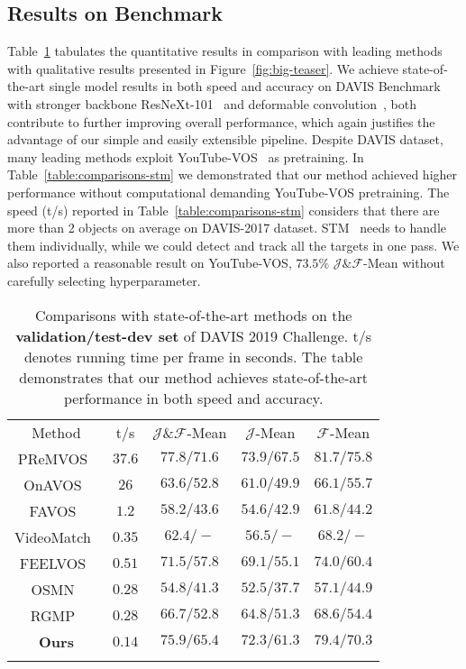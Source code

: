 \documentclass[10pt,twocolumn,letterpaper]{article}
\begin{document}
\subsection{Results on Benchmark}
\vspace{-0.5em}
Table~\ref{table:comparisons-stoa} tabulates the quantitative results in comparison with  leading methods with qualitative results presented in Figure~\ref{fig:big-teaser}.
We achieve state-of-the-art single model results in both speed and accuracy on DAVIS Benchmark with stronger backbone ResNeXt-101~\cite{xie2017resnext} and deformable convolution~\cite{dai2017deformable},
both contribute to further improving  overall performance, which again justifies the advantage of our simple and easily extensible pipeline.
Despite DAVIS dataset, many leading methods exploit YouTube-VOS~\cite{xu2018youtube} as pretraining. In Table~\ref{table:comparisons-stm} we demonstrated that our method achieved higher performance without computational demanding YouTube-VOS pretraining. The speed (t/s) reported in Table~\ref{table:comparisons-stm} considers that there are more than 2 objects on average on DAVIS-2017 dataset. STM~\cite{oh2019stm} needs to handle them individually, while we could detect and track all the targets in one pass. We also reported a reasonable result on YouTube-VOS, $73.5\%$ $\mathcal{J} \& \mathcal{F}$-Mean without carefully selecting hyperparameter. 
\begin{table}
\small
\centering
\addtolength{\tabcolsep}{-3.5pt}
\begin{tabular}{c|c|ccc}
\Xhline{1.0pt}
Method & t/s & $\mathcal{J}$\&$\mathcal{F}$-Mean & $\mathcal{J}$-Mean & $\mathcal{F}$-Mean \\
\Xhline{1.0pt}
PReMVOS~\cite{luiten2018premvos} &$37.6$&$\mathbf{77.8/71.6}$&$\mathbf{73.9/67.5}$&$\mathbf{81.7/75.8}$ \\
OnAVOS~\cite{voigtlaender2017online}  &$26$&$63.6/52.8$&$61.0/49.9$&$66.1/55.7$ \\
FAVOS~\cite{cheng2018favos}  &$1.2$&$58.2/43.6$&$54.6/42.9$&$61.8/44.2$ \\
VideoMatch~\cite{hu2018videomatch} &$0.35$&$62.4/-$&$56.5/-$&$68.2/-$ \\
FEELVOS~\cite{voigtlaender2019feelvos} &$0.51$&$71.5/57.8$&$69.1/55.1$&$74.0/60.4$ \\
OSMN~\cite{yang2018efficient} &$\mathbf{0.28}$&$54.8/41.3$&$52.5/37.7$&$57.1/44.9$ \\
RGMP~\cite{wug2018fast}    &$\mathbf{0.28}$&$66.7/52.8$&$64.8/51.3$&$68.6/54.4$ \\
\hline
\textbf{Ours} &$\mathbf{0.14}$&$\mathbf{75.9/65.4}$&$\mathbf{72.3/61.3}$&$\mathbf{79.4/70.3}$\\
\Xhline{1.0pt}
\end{tabular}
\caption{Comparisons with state-of-the-art methods on the \textbf{validation/test-dev set} of DAVIS 2019 Challenge. t/s denotes running time per frame in seconds.
The table demonstrates that our method achieves state-of-the-art performance in both speed and accuracy.}
\label{table:comparisons-stoa}
\vspace{-0.2in}
\end{table}
\end{document}

